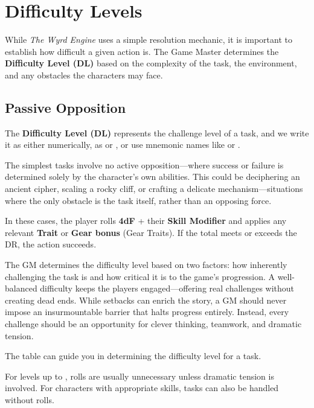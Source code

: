 


\section{Difficulty Levels}
\label{core:difficulty-levels}

While \emph{The Wyrd Engine} uses a simple resolution mechanic, it is important to establish how difficult a given action is. The Game Master determines the \textbf{Difficulty Level (DL)} based on the complexity of the task, the environment, and any obstacles the characters may face.

\subsection{Passive Opposition}
The \textbf{Difficulty Level (DL)} represents the challenge level of a task, and we write it as either numerically, as  or , or use mnemonic names like \Challenging or \Formidable.

The simplest tasks involve no active opposition—where success or failure is determined solely by the character’s own abilities. This could be deciphering an ancient cipher, scaling a rocky cliff, or crafting a delicate mechanism—situations where the only obstacle is the task itself, rather than an opposing force.

In these cases, the player rolls \textbf{4dF} + their \textbf{Skill Modifier} and applies any relevant \textbf{Trait} or \textbf{Gear bonus} (Gear Traits). If the total meets or exceeds the DR, the action succeeds.

The GM determines the difficulty level based on two factors: how inherently challenging the task is and how critical it is to the game’s progression. A well-balanced difficulty keeps the players engaged—offering real challenges without creating dead ends. While setbacks can enrich the story, a GM should never impose an insurmountable barrier that halts progress entirely. Instead, every challenge should be an opportunity for clever thinking, teamwork, and dramatic tension.

The table  can guide you in determining the difficulty level for a task.

For levels up to , rolls are usually unnecessary unless dramatic tension is involved. For characters with appropriate skills,  tasks can also be handled without rolls.

